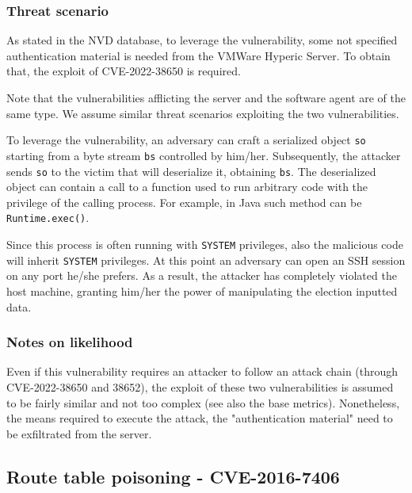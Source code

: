 \subsubsection*{Threat scenario}

As stated in the NVD database\cite{online:cve-2022-38652}, to leverage the vulnerability, some not specified authentication material is needed from the VMWare Hyperic Server. To obtain that, the exploit of CVE-2022-38650 is required.

Note that the vulnerabilities afflicting the server and the software agent are of the same type\cite{online:cve-2022-38650}. We assume similar threat scenarios exploiting the two vulnerabilities.

To leverage the vulnerability, an adversary can craft a serialized object \texttt{so} starting from a byte stream \texttt{bs} controlled by him/her. Subsequently, the attacker sends \texttt{so} to the victim that will deserialize it, obtaining \texttt{bs}. The deserialized object can contain a call to a function used to run arbitrary code with the privilege of the calling process\cite{artile:Java_Deserialization_Remote-Code_Execution}. For example, in Java such method can be \texttt{Runtime.exec()}.

Since this process is often running with \texttt{SYSTEM} privileges\cite{online:cve-2022-38652}, also the malicious code will inherit \texttt{SYSTEM} privileges. At this point an adversary can open an SSH session on any port he/she prefers. As a result, the attacker has completely violated the host machine, granting him/her the power of manipulating the election inputted data.

\subsubsection*{Notes on likelihood}

Even if this vulnerability requires an attacker to follow an attack chain (through CVE-2022-38650 and 38652), the exploit of these two vulnerabilities is assumed to be fairly similar and not too complex (see also the base metrics). Nonetheless, the means required to execute the attack, the "authentication material" need to be exfiltrated from the server.

\subsection*{Route table poisoning - CVE-2016-7406}

